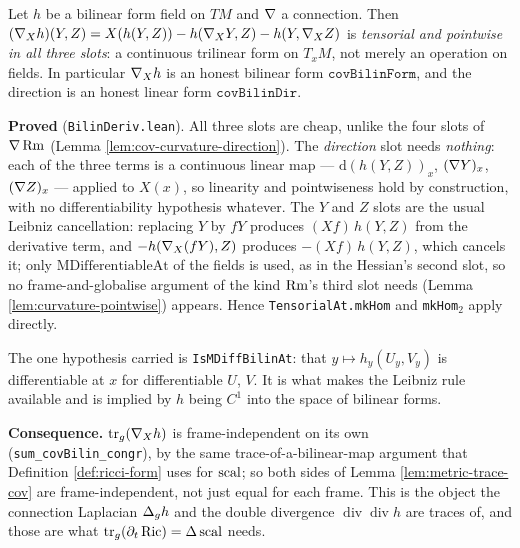 \begin{lemma}
  \label{lem:cov-bilin-tensor}
  \leanok
  Let $h$ be a bilinear form field on $TM$ and $\nabla$ a connection. Then
  $(\nabla_X h)(Y,Z) = X(h(Y,Z)) - h(\nabla_X Y, Z) - h(Y, \nabla_X Z)$ is
  \emph{tensorial and pointwise in all three slots}: a continuous trilinear
  form on $T_xM$, not merely an operation on fields. In particular
  $\nabla_X h$ is an honest bilinear form $\texttt{covBilinForm}$, and the
  direction is an honest linear form $\texttt{covBilinDir}$.

  \textbf{Proved} (\texttt{BilinDeriv.lean}). All three slots are cheap,
  unlike the four slots of $\nabla\operatorname{Rm}$ (Lemma \ref{lem:cov-curvature-direction}).
  The \emph{direction} slot needs \emph{nothing}: each of the three terms is a
  continuous linear map --- $\mathrm{d}(h(Y,Z))_x$, $(\nabla Y)_x$, $(\nabla Z)_x$
  --- applied to $X(x)$, so linearity and pointwiseness hold by construction,
  with no differentiability hypothesis whatever. The $Y$ and $Z$ slots are the
  usual Leibniz cancellation: replacing $Y$ by $fY$ produces $(Xf)\,h(Y,Z)$
  from the derivative term, and $-h(\nabla_X(fY),Z)$ produces $-(Xf)\,h(Y,Z)$,
  which cancels it; only $\mathrm{MDifferentiableAt}$ of the fields is used,
  as in the Hessian's second slot, so no frame-and-globalise argument of the
  kind $\operatorname{Rm}$'s third slot needs (Lemma \ref{lem:curvature-pointwise}) appears.
  Hence \texttt{TensorialAt.mkHom} and \texttt{mkHom}$_2$ apply directly.

  The one hypothesis carried is \texttt{IsMDiffBilinAt}: that $y \mapsto h_y(U_y,
  V_y)$ is differentiable at $x$ for differentiable $U$, $V$. It is what makes
  the Leibniz rule available and is implied by $h$ being $C^1$ into the space
  of bilinear forms.

  \textbf{Consequence.} $\operatorname{tr}_g(\nabla_X h)$ is frame-independent
  on its own (\texttt{sum\_covBilin\_congr}), by the same trace-of-a-bilinear-map
  argument that Definition \ref{def:ricci-form} uses for $\operatorname{scal}$; so both sides
  of Lemma \ref{lem:metric-trace-cov} are frame-independent, not just equal for
  each frame. This is the object the connection Laplacian $\Delta_g h$ and the
  double divergence $\operatorname{div}\operatorname{div} h$ are traces of, and
  those are what $\operatorname{tr}_g(\partial_t \operatorname{Ric}) = \Delta \operatorname{scal}$ needs.
\end{lemma}

